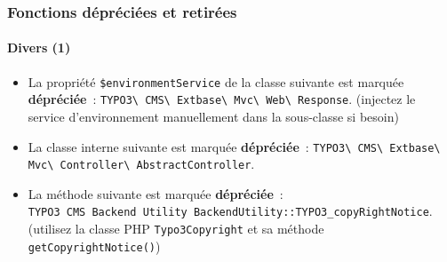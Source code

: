 \begin{frame}[fragile]
	\frametitle{Fonctions dépréciées et retirées}
	\framesubtitle{Divers (1)}

	\lstset{basicstyle=\tiny\ttfamily}

	\begin{itemize}

		\item La propriété \texttt{\$environmentService} de la classe suivante est marquée \textbf{dépréciée}~:
			\texttt{TYPO3\textbackslash
				CMS\textbackslash
				Extbase\textbackslash
				Mvc\textbackslash
				Web\textbackslash
				Response}.\newline
			\smaller
				(injectez le service d'environnement manuellement dans la sous-classe si besoin)
			\normalsize

		\item La classe interne suivante est marquée \textbf{dépréciée}~:\newline
			\texttt{TYPO3\textbackslash
				CMS\textbackslash
				Extbase\textbackslash
				Mvc\textbackslash
				Controller\textbackslash
				AbstractController}.

		\item La méthode suivante est marquée \textbf{dépréciée}~:\newline
			\texttt{TYPO3\
				CMS\
				Backend\
				Utility\
				BackendUtility::TYPO3\_copyRightNotice}.\newline
				\smaller
					(utilisez la classe PHP \texttt{Typo3Copyright} et sa méthode \texttt{getCopyrightNotice()})
				\normalsize

	\end{itemize}

\end{frame}


